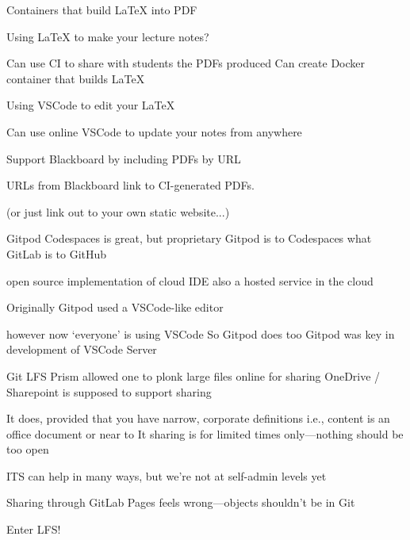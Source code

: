 \documentclass[aspectratio=169,t]{beamer}
\begin{document}
\begin{dframe}{Containers that build \LaTeX{} into PDF}

  \1 Using \LaTeX{} to make your lecture notes?
  
  \2 Can use CI to share with students the PDFs produced
  \2 Can create Docker container that builds \LaTeX{}
  
  \1 Using VSCode to edit your \LaTeX{}

  \2 Can use online VSCode to update your notes from anywhere


  \1 Support Blackboard by including PDFs by URL
 
  \2 URLs from Blackboard link to CI-generated PDFs.

  \2 (or just link out to your own static website...)

\end{dframe}


\begin{dframe}{Gitpod}
  \1 Codespaces is great, but proprietary
  \1 Gitpod is to Codespaces what GitLab is to GitHub
  
  \2 open source implementation of cloud IDE
  \2 also a hosted service in the cloud

  \1 Originally Gitpod used a VSCode-like editor

  \2 however now `everyone' is using VSCode
  \2 So Gitpod does too
  \2 Gitpod was key in development of VSCode Server
\end{dframe}

\begin{dframe}{Git LFS}
  \1 Prism allowed one to plonk large files online for sharing
  \1 OneDrive / Sharepoint is supposed to support sharing

  \2 It does, provided that you have narrow, corporate definitions
  \2 i.e., content is an office document or near to It
  \2 sharing is for limited times only---nothing should be too open

  \1 ITS can help in many ways, but we're not at self-admin levels yet

  \1 Sharing through GitLab Pages feels wrong---objects shouldn't be in Git
  
  \1 Enter LFS!

\end{dframe}

\begin{comment}
\begin{dframe}{FaaS, serverless and responsiveness}
  \1 Edge appearance
\end{dframe}
\end{comment}
\end{document}
